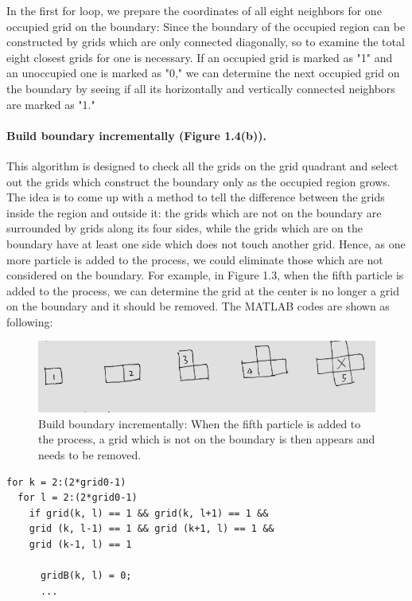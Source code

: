 \documentclass[letterpaper]{article}
\numberwithin{equation}{section} %
\numberwithin{figure}{section} %
\numberwithin{table}{section} %
\begin{document}
\noindent
In the first for loop, we prepare the coordinates of all eight neighbors for one occupied grid on the boundary: Since the boundary of the occupied region can be constructed by grids which are only connected diagonally, so to examine the total eight closest grids for one is necessary. If an occupied grid is marked as "1" and an unoccupied one is marked as "0," we can determine the next occupied grid on the boundary by seeing if all its horizontally and vertically connected neighbors are marked as "1."

\paragraph{Build boundary incrementally (Figure 1.4(b)).} 
This algorithm is designed to check all the grids on the grid quadrant and select out the grids which construct the boundary only as the occupied region grows. The idea is to come up with a method to tell the difference between the grids inside the region and outside it: the grids which are not on the boundary are surrounded by grids along its four sides, while the grids which are on the boundary have at least one side which does not touch another grid. Hence, as one more particle is added to the process, we could eliminate those which are not considered on the boundary. For example, in Figure 1.3, when the fifth particle is added to the process, we can determine the grid at the center is no longer a grid on the boundary and it should be removed. The MATLAB codes are shown as following: 

\begin{figure}[h]
		\centering
		\includegraphics[width=0.7\linewidth]{bdryAlg2}
		\caption{Build boundary incrementally: When the fifth particle is added to the process, a grid which is not on the boundary is then appears and needs to be removed.}
		\label{fig:bdryAlg2}
\end{figure}




\begin{lstlisting}
for k = 2:(2*grid0-1)
  for l = 2:(2*grid0-1)
    if grid(k, l) == 1 && grid(k, l+1) == 1 && 
    grid (k, l-1) == 1 && grid (k+1, l) == 1 && 
    grid (k-1, l) == 1
    
      gridB(k, l) = 0; 
      ...
\end{lstlisting}
\end{document}
